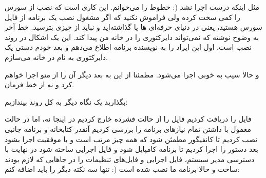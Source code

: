 \begin{mybox}
\flushleft
{}











\end{mybox}
مثل اینکه درست اجرا نشد (: خطوط را می‌خوانم. این کاری است که نصب از سورس را کمی سخت کرده ولی فراموش نکنید که اگر مشغول نصب یک برنامه از فایل سورس هستید، یعنی در دنیای حرفه‌ای ها پا گذاشته‌اید و نباید از چیزی بترسید. خط آخر به وضوح نوشته که نمی‌تواند دایرکتوری 
 را در خانه من پیدا کند. این یک اشکال در روند نصب است. اول این ایراد را به نویسنده برنامه اطلاع می‌دهم و بعد خودم دستی یک دایرکتوری به نام 
 در خانه می‌سازم.
\begin{mybox}
\flushleft
{}



\end{mybox}
و حالا سیب به خوبی اجرا می‌شود. مطمئنا از این به بعد دیگر آن را از منو اجرا خواهم کرد و نه از خط فرمان.

بگذارید یک نگاه دیگر به کل روند بیندازیم:

فایل را دریافت کردیم
فایل را از حالت فشرده خارج کردیم
در اینجا نه، اما در حالت معمول با 
 داشتن تمام نیازهای برنامه را بررسی کردیم
آنقدر کتابخانه و برنامه جانبی نصب کردیم تا کانفیگور مطمئن شود که همه چیز مرتب است و با موفقیت اجرا بشود
بعد دستور 
 را اجرا کردیم تا برنامه کامپایل شود و فایل اجرایی ساخته شود
در نهایت 
 با دسترسی مدیر سیستم، فایل اجرایی و فایل‌های تنظیمات را در جاهایی که لازم بودند ساخت
و حالا برنامه ما نصب شده است (: تنها سه نکته دیگر را باید اضافه کنم:

